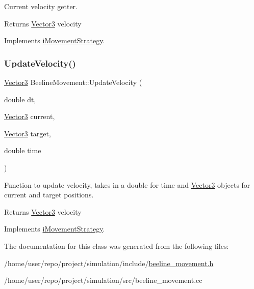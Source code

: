 Current velocity getter. 

\begin{DoxyReturn}{Returns}
\hyperlink{classVector3}{Vector3} velocity 
\end{DoxyReturn}


Implements \hyperlink{classiMovementStrategy_a92f20c8ebf7c4f7dde5743528b8e45b7}{i\+Movement\+Strategy}.

\mbox{\label{classBeelineMovement_a6fd4a3d6f7be2cb6dfe623ce40fc55c4}} 
\subsubsection{\texorpdfstring{Update\+Velocity()}{UpdateVelocity()}}
{\footnotesize\ttfamily \hyperlink{classVector3}{Vector3} Beeline\+Movement\+::\+Update\+Velocity (\begin{DoxyParamCaption}\item[{double}]{dt,  }\item[{\hyperlink{classVector3}{Vector3}}]{current,  }\item[{\hyperlink{classVector3}{Vector3}}]{target,  }\item[{double}]{time }\end{DoxyParamCaption})\hspace{0.3cm}{\ttfamily [virtual]}}



Function to update velocity, takes in a double for time and \hyperlink{classVector3}{Vector3} objects for current and target positions. 

\begin{DoxyReturn}{Returns}
\hyperlink{classVector3}{Vector3} velocity 
\end{DoxyReturn}


Implements \hyperlink{classiMovementStrategy_a40ec6c329ca0842638af80cfd509b372}{i\+Movement\+Strategy}.



The documentation for this class was generated from the following files\+:\begin{DoxyCompactItemize}
\item 
/home/user/repo/project/simulation/include/\hyperlink{beeline__movement_8h}{beeline\+\_\+movement.\+h}\item 
/home/user/repo/project/simulation/src/beeline\+\_\+movement.\+cc\end{DoxyCompactItemize}
